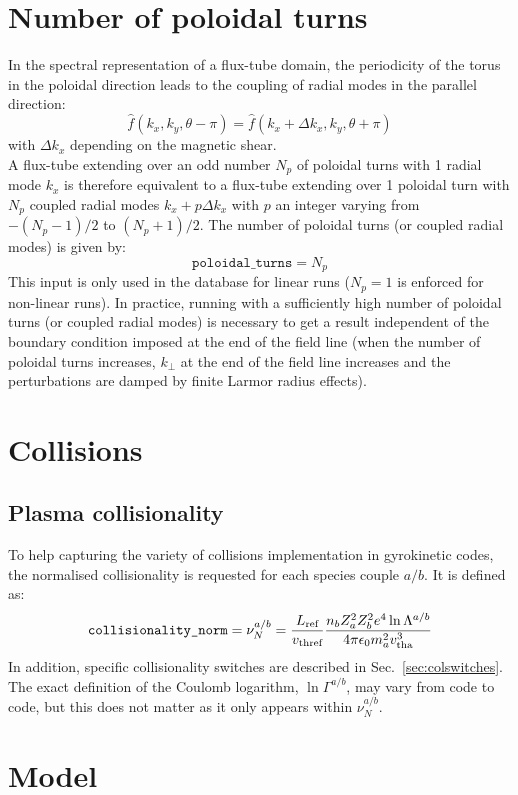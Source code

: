 \documentclass[a4paper]{report}
\begin{document}
\section{Number of poloidal turns} \label{sec:polturns}
In the spectral representation of a flux-tube domain, the periodicity of the torus in the poloidal direction leads to the coupling of radial modes in the parallel direction:
$$\hat{f}(k_x,k_y,\theta-\pi)=\hat{f}(k_x+\Delta k_x,k_y,\theta+\pi)$$
with $\Delta k_x$ depending on the magnetic shear.\\
A flux-tube extending over an odd number $N_p$ of poloidal turns with 1 radial mode $k_x$ is therefore equivalent to a flux-tube extending over 1 poloidal turn with $N_p$ coupled radial modes $k_x + p\Delta k_x$ with $p$ an integer varying from $-(N_p-1)/2$ to $(N_p+1)/2$. The number of poloidal turns (or coupled radial modes) is given by:
$$\texttt{poloidal\_turns}=N_p$$
This input is only used in the database for linear runs ($N_p=1$ is enforced for non-linear runs).
In practice, running with a sufficiently high number of poloidal turns (or coupled radial modes) is necessary to get a result independent of the boundary condition imposed at the end of the field line (when the number of poloidal turns increases, $k_\perp$ at the end of the field line increases and the perturbations are damped by finite Larmor radius effects). 

\section{Collisions}
\subsection{Plasma collisionality} \label{sec:collisionality}
To help capturing the variety of collisions implementation in gyrokinetic codes, the normalised collisionality is requested for each species couple $a/b$. It is defined as:
$$\texttt{collisionality\_norm}=\nu^{a/b}_N=\frac{L_{\textrm{ref}}}{v_\textrm{thref}}\frac{n_bZ_a^2Z_b^2e^4\ln \Lambda^{a/b}}{4\pi\epsilon_0m_a^2v_\textrm{tha}^3}$$
In addition, specific collisionality switches are described in Sec.~\ref{sec:colswitches}. The exact definition of the Coulomb logarithm, $\ln \Gamma^{a/b}$, may vary from code to code, but this does not matter as it only appears within $\nu^{a/b}_N$.\\


\section{Model} 
\end{document}
